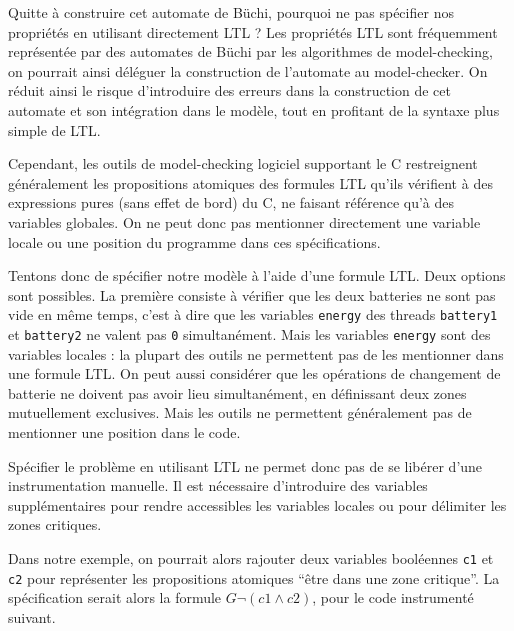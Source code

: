 Quitte à construire cet automate de Büchi, pourquoi ne pas spécifier nos
propriétés en utilisant directement LTL ? Les propriétés LTL sont fréquemment
représentée par des automates de Büchi par les algorithmes de model-checking, on
pourrait ainsi déléguer la construction de l'automate au model-checker.
On réduit ainsi le risque d'introduire des erreurs dans la construction de cet
automate et son intégration dans le modèle, tout en profitant de la syntaxe plus
simple de LTL.

Cependant, les outils de model-checking logiciel supportant le C restreignent
généralement les propositions atomiques des formules LTL qu'ils vérifient à des
expressions pures (sans effet de bord) du C, ne faisant référence qu'à des
variables globales. On ne peut donc pas mentionner directement une variable
locale ou une position du programme dans ces spécifications.

Tentons donc de spécifier notre modèle à l'aide d'une formule LTL. Deux
options sont possibles. La première consiste à vérifier que les deux
batteries ne sont pas vide en même temps, c'est à dire que les variables
\texttt{energy} des threads \texttt{battery1} et
\texttt{battery2} ne valent pas \texttt{0} simultanément. Mais les
variables \texttt{energy} sont des variables locales : la
plupart des outils ne permettent pas de les mentionner dans une formule
LTL. On peut aussi considérer que les opérations de changement de
batterie ne doivent pas avoir lieu simultanément, en définissant deux
zones mutuellement exclusives. Mais les outils ne permettent
généralement pas de mentionner une position dans le code.

Spécifier le problème en utilisant LTL ne permet donc pas de se libérer
d'une instrumentation manuelle. Il est nécessaire d'introduire des
variables supplémentaires pour rendre accessibles les variables locales
ou pour délimiter les zones critiques.

Dans notre exemple, on pourrait alors rajouter deux variables booléennes
\texttt{c1} et \texttt{c2} pour représenter les propositions atomiques
``être dans une zone critique''. La spécification serait alors
la formule \(G \lnot (c1 \land c2)\), pour le code instrumenté suivant.

